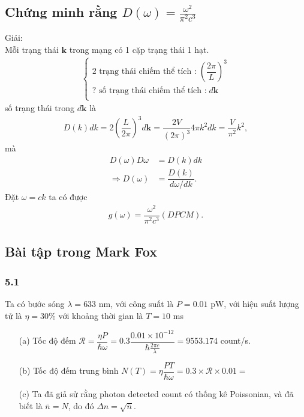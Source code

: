 \documentclass{article}
\newcommand{\f}[2]{\dfrac{#1}{#2}}
\begin{document}
\subsection*{Chứng minh rằng $D(\omega) = \frac{\omega^2}{\pi^2 c^3}$}
Giải:\\
Mỗi trạng thái $\mathbf{k}$ trong mạng có 1 cặp trạng thái 1 hạt.
\begin{align*}
	\begin{cases}
		\text{2 trạng thái chiếm thể tích :} \; \left(\f{2\pi}{L}\right)^3 \\
		\text{? số trạng thái chiếm thể tích :} \; d\mathbf{k}             \\
	\end{cases}
\end{align*}
số trạng thái trong $d\mathbf{k}$ là
\begin{align*}
	D(k)dk = 2  \left(\f{L}{2\pi}\right)^3 d\mathbf{k} = \f{2V}{(2\pi)^3} 4\pi k^2 dk = \f{V}{\pi^2}k^2,
\end{align*}
mà
\begin{align*}
	D(\omega) D\omega     & = D(k) dk                 \\
	\Rightarrow D(\omega) & = \f{D(k)}{d\omega / dk}.
\end{align*}
Đặt $\omega = ck$ ta có được
\begin{align*}
	g(\omega) = \f{\omega^2}{\pi^2 c^3} (DPCM).
\end{align*}

\subsection*{Bài tập trong Mark Fox}
\subsubsection*{5.1}
Ta có bước sóng $\lambda = 633$ nm, với công suất là $P = 0.01$ pW, với hiệu suất lượng tử là $\eta = 30\% $ với khoảng thời gian là $T = 10$ ms
\begin{enumerate}
	\item[(a)] Tốc độ đếm $\mathcal{R} = \f{\eta P}{\hbar \omega} = 0.3 \f{0.01 \times 10^{-12}}{\hbar \frac{2\pi c}{\lambda}} = 9553.174$ count/s.
	\item[(b)] Tốc độ đếm trung bình $N(T)= \eta \f{PT}{\hbar \omega} = 0.3 \times \mathcal{R}\times 0.01 =$
	\item[(c)] Ta đã giả sử rằng photon detected count có thống kê Poissonian, và đã biết là $\overline{n} = N$, do đó $\Delta n = \sqrt{\overline{n}}$.
\end{enumerate}
\end{document}
